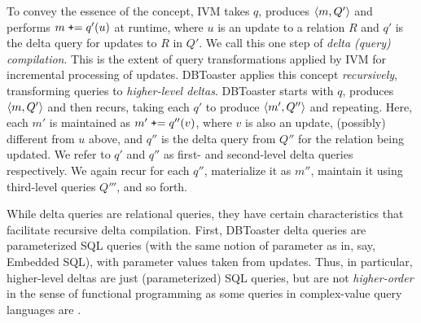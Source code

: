 To convey the essence of the concept, IVM takes $q$, produces ${\langle m,Q'\rangle}$ and
performs $m \; \mbox{{\tt +}=} \; q'(u)$ at runtime, where $u$ is an update to a
relation $R$ and $q'$ is the delta query for updates to $R$ in $Q'$. We call
this one step of \textit{delta (query) compilation}. This is the extent of query
transformations applied by IVM for incremental processing of updates. DBToaster
applies this concept \textit{recursively}, transforming queries to
\textit{higher-level deltas}. DBToaster starts with $q$, produces ${\langle m,Q'\rangle}$
and then recurs, taking each $q'$ to produce ${\langle m', Q''\rangle}$ and repeating.
Here, each $m'$ is maintained as $m' \; \mbox{{\tt +}=} \; q''(v)$, where $v$ is
also an update, (possibly) different from $u$ above, and $q''$ is the delta
query from $Q''$ for the relation being updated. We refer to $q'$ and $q''$ as
first- and second-level delta queries respectively. We again recur for each
$q''$, materialize it as $m''$, maintain it using third-level queries $Q'''$,
and so forth.


While delta queries are relational queries, they have certain characteristics
that facilitate recursive delta compilation. First, DBToaster delta queries are
parameterized SQL queries (with the same notion of parameter as in, say,
Embedded SQL), with parameter values taken from updates. Thus, in particular,
higher-level deltas are just (parameterized) SQL queries, but are not
{\em higher-order}\/ in the sense of functional programming as some queries in
complex-value query languages are \cite{buneman-kleisli:95}.

